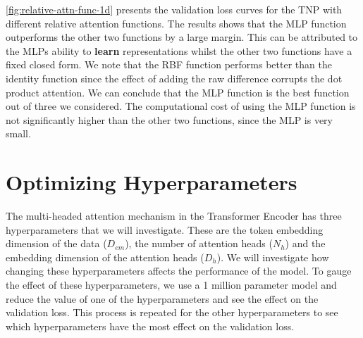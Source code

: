 \documentclass[../../main.tex]{subfiles}
\begin{document}
\autoref{fig:relative-attn-func-1d} presents the validation loss curves for the TNP with different relative attention functions. The results shows that the MLP function outperforms the other two functions by a large margin. This can be attributed to the MLPs ability to \textbf{learn} representations whilst the other two functions have a fixed closed form. We note that the RBF function performs better than the identity function since the effect of adding the raw difference corrupts the dot product attention. We can conclude that the MLP function is the best function out of three we considered. The computational cost of using the MLP function is not significantly higher than the other two functions, since the MLP is very small.



\section{Optimizing Hyperparameters}

The multi-headed attention mechanism in the Transformer Encoder has three hyperparameters that we will investigate. These are
the token embedding dimension of the data ($D_{em}$), the number of attention heads ($N_h$) and the embedding dimension of the attention heads ($D_h$). We will investigate how changing these hyperparameters affects the performance of the model. To gauge the effect of these hyperparameters, we use a 1 million parameter model and reduce the value of one of the hyperparameters and see the effect on the validation loss. This process is repeated for the other hyperparameters to see which hyperparameters have the most effect on the validation loss. 
\end{document}
